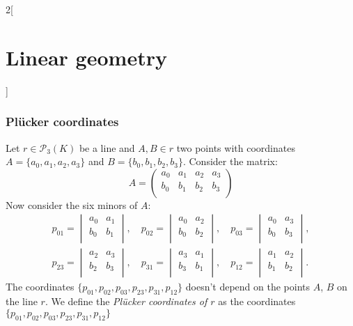 \documentclass[../../../main.tex]{subfiles}
\begin{document}
\begin{multicols}{2}[\section{Linear geometry}]
    \subsubsection*{Plücker coordinates}
    \begin{prop}
        Let $r\in\mathcal{P}_3(K)$ be a line and $A,B\in r$ two points with coordinates $A=\{a_0,a_1,a_2,a_3\}$ and $B=\{b_0,b_1,b_2,b_3\}$. Consider the matrix: $$A=\begin{pmatrix}
                a_0 & a_1 & a_2 & a_3 \\
                b_0 & b_1 & b_2 & b_3 \\
            \end{pmatrix}$$ Now consider the six minors of $A$:
        \begin{gather*}
            p_{01}=\begin{vmatrix}
                a_0 & a_1 \\
                b_0 & b_1 \\
            \end{vmatrix},\quad p_{02}=\begin{vmatrix}
                a_0 & a_2 \\
                b_0 & b_2 \\
            \end{vmatrix},\quad p_{03}=\begin{vmatrix}
                a_0 & a_3 \\
                b_0 & b_3 \\
            \end{vmatrix},\\ p_{23}=\begin{vmatrix}
                a_2 & a_3 \\
                b_2 & b_3 \\
            \end{vmatrix},\quad p_{31}=\begin{vmatrix}
                a_3 & a_1 \\
                b_3 & b_1 \\
            \end{vmatrix},\quad p_{12}=\begin{vmatrix}
                a_1 & a_2 \\
                b_1 & b_2 \\
            \end{vmatrix}.
        \end{gather*}
        The coordinates $\{p_{01},p_{02},p_{03},p_{23},p_{31},p_{12}\}$ doesn't depend on the points $A$, $B$ on the line $r$. We define the \textit{Plücker coordinates of $r$} as the coordinates $\{p_{01},p_{02},p_{03},p_{23},p_{31},p_{12}\}$

\end{prop}
\end{multicols}
\end{document}
